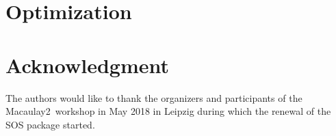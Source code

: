 \documentclass[11pt]{amsart}
\theoremstyle{plain}%
\theoremstyle{definition}
\theoremstyle{remark}
\newcommand{\Mac}{Macaulay2\xspace}
\begin{document}

\section{Optimization}




\section*{Acknowledgment}
\label{sec:acknowledgement}
The authors would like to thank the organizers and participants of the
\Mac\ workshop in May 2018 in Leipzig during which the renewal of the
SOS package started.



\end{document}
